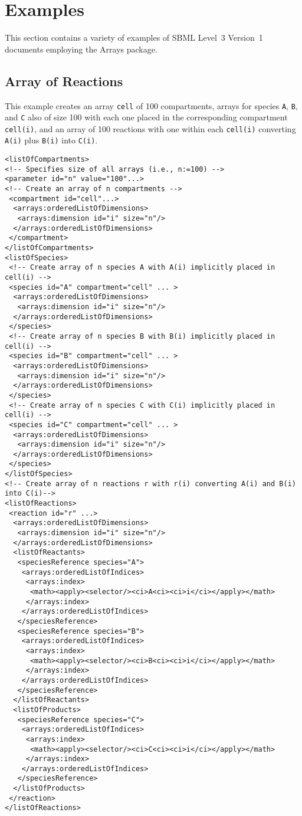 
\section{Examples}
\label{examples}

This section contains a variety of examples of SBML Level~3 Version~1
documents employing the Arrays package.

\subsection{Array of Reactions}

This example creates an array {\tt cell} of 100 compartments, arrays for species {\tt A}, {\tt B}, and {\tt C} also of size 100 with each one placed in the corresponding compartment {\tt cell(i)}, and an array of 100 reactions with one within each {\tt cell(i)} converting {\tt A(i)} plus {\tt B(i)} into {\tt C(i)}.

\begin{verbatim}
<listOfCompartments> 
<!-- Specifies size of all arrays (i.e., n:=100) -->
<parameter id="n" value="100"...>
<!-- Create an array of n compartments -->
 <compartment id="cell"...>
  <arrays:orderedListOfDimensions>
   <arrays:dimension id="i" size="n"/>
  </arrays:orderedListOfDimensions>
 </compartment>
</listOfCompartments> 
<listOfSpecies>
 <!-- Create array of n species A with A(i) implicitly placed in cell(i) -->
 <species id="A" compartment="cell" ... > 
  <arrays:orderedListOfDimensions>
   <arrays:dimension id="i" size="n"/>
  </arrays:orderedListOfDimensions>
 </species>
 <!-- Create array of n species B with B(i) implicitly placed in cell(i) -->
 <species id="B" compartment="cell" ... > 
  <arrays:orderedListOfDimensions>
   <arrays:dimension id="i" size="n"/>
  </arrays:orderedListOfDimensions>
 </species>
 <!-- Create array of n species C with C(i) implicitly placed in cell(i) -->
 <species id="C" compartment="cell" ... >
  <arrays:orderedListOfDimensions>
   <arrays:dimension id="i" size="n"/>
  </arrays:orderedListOfDimensions>
 </species>
</listOfSpecies>
<!-- Create array of n reactions r with r(i) converting A(i) and B(i) into C(i)-->
<listOfReactions>
 <reaction id="r" ...> 
  <arrays:orderedListOfDimensions>
   <arrays:dimension id="i" size="n"/>
  </arrays:orderedListOfDimensions>
  <listOfReactants>
   <speciesReference species="A">
    <arrays:orderedListOfIndices>
     <arrays:index>
      <math><apply><selector/><ci>A<ci><ci>i</ci></apply></math>
     </arrays:index>
    </arrays:orderedListOfIndices>
   </speciesReference>
   <speciesReference species="B"> 
    <arrays:orderedListOfIndices>
     <arrays:index>
      <math><apply><selector/><ci>B<ci><ci>i</ci></apply></math>
     </arrays:index>
    </arrays:orderedListOfIndices>
   </speciesReference>
  </listOfReactants> 
  <listOfProducts>
   <speciesReference species="C"> 
    <arrays:orderedListOfIndices>
     <arrays:index>
      <math><apply><selector/><ci>C<ci><ci>i</ci></apply></math>
     </arrays:index>
    </arrays:orderedListOfIndices>
   </speciesReference>
  </listOfProducts>
 </reaction>
</listOfReactions>
\end{verbatim}

